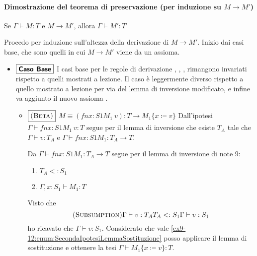 \paragraph{Dimostrazione del teorema di preservazione (per induzione su $M \to M'$)}

	Se $\Gamma \vdash M : T$ e $M \longrightarrow M'$, allora
	$\Gamma \vdash M':T$


Procedo per induzione sull'altezza della derivazione di $M \longrightarrow M'$.
Inizio dai casi base, che sono quelli in cui $M \longrightarrow M'$ viene da un assioma.
\begin{itemize}
	\item $\boxed{\text{\textbf{Caso Base}}}$
	I casi base per le regole di derivazione , , ,  rimangono
	invariati rispetto a quelli mostrati a lezione. Il caso  \`e leggermente diverso rispetto a quello 
	mostrato a lezione per via del lemma di inversione modificato, e infine va aggiunto il nuovo assioma .
	\begin{itemize}
		
		\item $\boxed{\textsc{(Beta)}}$
		$M\equiv (fn x:S1 M_1\ v) : T \longrightarrow M_1 \{x \coloneqq v\}$  
		Dall'ipotesi $\Gamma \vdash fn x:S1 M_1\ v : T$ segue per il lemma di inversione 
		che esiste $T_A$ tale che $\Gamma \vdash v : T_A$ e $\Gamma \vdash fn x:S1M_1: T_A \rightarrow T$.
		
		Da $\Gamma \vdash fn x:S1M_1 : T_A \rightarrow T$ segue per il lemma di inversione di note 9:
		\begin{enumerate}
			\item $T_A <: S_1$
			\item $\Gamma, x : S_1 \vdash M_1 : T$
			\label{ex9-12:enum:SecondaIpotesiLemmaSostituzione}
		\end{enumerate}
			
		Visto che
		$$
		{\textsc{(Subsumption)}}
		{\Gamma \vdash v : T_A}
		{T_A <: S_1}
		{\Gamma \vdash v : S_1}
		$$
		ho ricavato che $\Gamma \vdash v : S_1$. Considerato che vale \ref{ex9-12:enum:SecondaIpotesiLemmaSostituzione} posso applicare
		il lemma di sostituzione e ottenere la tesi $\Gamma \vdash M_1 \{x \coloneqq v \} : T$.
		

\end{itemize}
\end{itemize}
